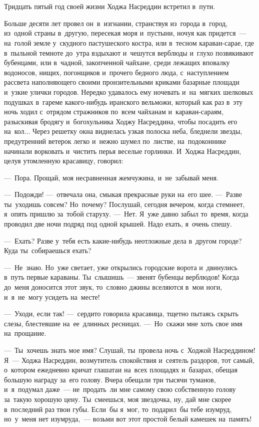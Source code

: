 \documentclass[12pt,a4paper]{book}
\begin{document}
\chapter{}

Тридцать пятый год своей жизни Ходжа Насреддин встретил в~пути.

Больше десяти лет провел он~в~изгнании, странствуя из~города в~город, из~одной страны в~другую, пересекая моря и~пустыни, ночуя как придется~— на~голой земле у~скудного пастушеского костра, или в~тесном караван-сарае, где в~пыльной темноте до~утра вздыхают и~чешутся верблюды и~глухо позвякивают бубенцами, или в~чадной, закопченной чайхане, среди лежащих вповалку водоносов, нищих, погонщиков и~прочего бедного люда, с~наступлением рассвета наполняющего своими пронзительными криками базарные площади и~узкие улички городов. Нередко удавалось ему ночевать и~на~мягких шелковых подушках в~гареме какого-нибудь иранского вельможи, который как раз в~эту ночь ходил с~отрядом стражников по~всем чайханам и~караван-сараям, разыскивая бродягу и~богохульника Ходжу Насреддина, чтобы посадить его на~кол... Через решетку окна виднелась узкая полоска неба, бледнели звезды, предутренний ветерок легко и~нежно шумел по~листве, на~подоконнике начинали ворковать и~чистить перья веселые горлинки. И~Ходжа Насреддин, целуя утомленную красавицу, говорил:

—~Пора. Прощай, моя несравненная жемчужина, и~не~забывай меня.

—~Подожди! —~отвечала она, смыкая прекрасные руки на~его шее. —~Разве ты~уходишь совсем? Но~почему? Послушай, сегодня вечером, когда стемнеет, я~опять пришлю за~тобой старуху. —~Нет. Я~уже давно забыл то~время, когда проводил две ночи подряд под одной крышей. Надо ехать, я~очень спешу.

—~Ехать? Разве у~тебя есть какие-нибудь неотложные дела в~другом городе? Куда ты~собираешься ехать?

—~Не~знаю. Но~уже светает, уже открылись городские ворота и~двинулись в~путь первые караваны. Ты~слышишь~— звенят бубенцы верблюдов! Когда до~меня доносится этот звук, то~словно джины вселяются в~мои ноги, и~я~не~могу усидеть на~месте!

—~Уходи, если так! —~сердито говорила красавица, тщетно пытаясь скрыть слезы, блестевшие на~ее~длинных ресницах. —~Но~скажи мне хоть свое имя на~прощание.

—~Ты~хочешь знать мое имя? Слушай, ты~провела ночь с~Ходжой Насреддином! Я~— Ходжа Насреддин, возмутитель спокойствия и~сеятель раздоров, тот самый, о~котором ежедневно кричат глашатаи на~всех площадях и~базарах, обещая большую награду за~его голову. Вчера обещали три тысячи туманов, и~я~подумал даже~— не~продать~ли мне самому свою собственную голову за~такую хорошую цену. Ты~смеешься, моя звездочка, ну, дай мне скорее в~последний раз твои губы. Если~бы я~мог, то~подарил~бы тебе изумруд, но~у~меня нет изумруда,~— возьми вот этот простой белый камешек на~память!
\end{document}

